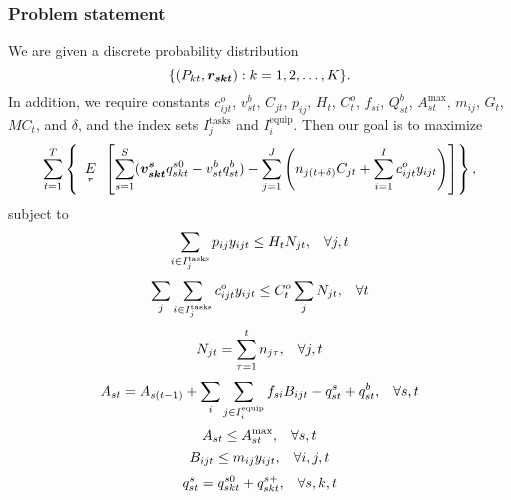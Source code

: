 \subsubsection{Problem statement}
We are given a discrete probability distribution 
\[
\{(P_{kt},\mathbf{\boldsymbol{r_{skt}}}): k=1,2,\ldots,K\}.
\]
In addition, we require constants $c^o_{ijt}$, $v^b_{st}$, $C_{jt}$, $p_{ij}$, $H_{t}$, $C^o_t$, $f_{si}$, $Q^b_{st}$, $A_{st}^{\text{max}}$, $m_{ij}$, $G_t$, $MC_t$, and $\delta$, and the index sets $I_j^{\text{tasks}}$ and $I_i^{\text{equip}}$.  Then our goal is to\newline
\noindent maximize
\begin{equation*}
\sum_{t=1}^T\left\{ \expect[r]\left[ \sum_{s=1}^S(\rand{v^s_{skt}} q^{s0}_{skt} - v^b_{st}q^b_{st}) - \sum_{j=1}^J\left(n_{j(t+\delta)} C_{jt} + \sum_{i=1}^I c^o_{ijt}y_{ijt}\right)\right] \right\},
\end{equation*}
\noindent subject to
\begin{equation*}
\sum_{i\in I_j^{\text{tasks}}} p_{ij} y_{ijt} \leq H_t N_{jt}, \hspace{3mm} \forall j,t
\end{equation*}
\begin{equation}
\label{CHEM:opex}
\sum_j \sum_{i\in I_j^{\text{tasks}}} c^o_{ijt} y_{ijt}\leq C^o_t \sum_j N_{jt}, \hspace{3mm} \forall t
\end{equation}
\begin{equation}
\label{CHEM:sumbuilt}
N_{jt}= \sum_{\tau = 1}^t n_{j\tau}, \hspace{3mm} \forall j,t
\end{equation}
\begin{equation}
\label{CHEM:matbal2}
A_{st} = A_{s(t-1)} + \sum_i \sum_{j\in I_i^{\text{equip}}} f_{si}B_{ijt} - q^s_{st} + q^b_{st}, \hspace{3mm} \forall s,t
\end{equation}
\begin{equation*}
A_{st} \leq A_{st}^{\text{max}}, \hspace{3mm} \forall s,t
\end{equation*}
\begin{equation*}
B_{ijt} \leq m_{ij} y_{ijt}, \hspace{3mm} \forall i,j,t
\end{equation*}
\begin{equation*}
q^s_{st} = q^{s0}_{skt} + q^{s+}_{skt}, \hspace{3mm} \forall s,k,t
\end{equation*}
